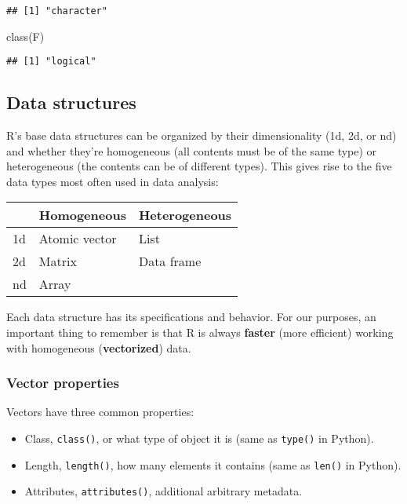 \documentclass[
]{book}
\newenvironment{Shaded}{\begin{snugshade}}{\end{snugshade}}
\newcommand{\FunctionTok}[1]{\textcolor[rgb]{0.00,0.00,0.00}{#1}}
\newcommand{\NormalTok}[1]{#1}
\providecommand{\tightlist}{%
  \setlength{\itemsep}{0pt}\setlength{\parskip}{0pt}}
\begin{document}
\begin{verbatim}
## [1] "character"
\end{verbatim}

\begin{Shaded}
\begin{Highlighting}[]
\FunctionTok{class}\NormalTok{(F)}
\end{Highlighting}
\end{Shaded}

\begin{verbatim}
## [1] "logical"
\end{verbatim}

\hypertarget{data-structures}{%
\subsection{Data structures}\label{data-structures}}

R's base data structures can be organized by their dimensionality (1d, 2d, or nd) and whether they're homogeneous (all contents must be of the same type) or heterogeneous (the contents can be of different types). This gives rise to the five data types most often used in data analysis:

\begin{longtable}[]{@{}lll@{}}
\toprule
& Homogeneous & Heterogeneous \\
\midrule
\endhead
1d & Atomic vector & List \\
2d & Matrix & Data frame \\
nd & Array & \\
\bottomrule
\end{longtable}

Each data structure has its specifications and behavior. For our purposes, an important thing to remember is that R is always \textbf{faster} (more efficient) working with homogeneous (\textbf{vectorized}) data.

\hypertarget{vector-properties}{%
\subsubsection{Vector properties}\label{vector-properties}}

Vectors have three common properties:

\begin{itemize}
\tightlist
\item
  Class, \texttt{class()}, or what type of object it is (same as \texttt{type()} in Python).
\item
  Length, \texttt{length()}, how many elements it contains (same as \texttt{len()} in Python).
\item
  Attributes, \texttt{attributes()}, additional arbitrary metadata.
\end{itemize}
\end{document}
